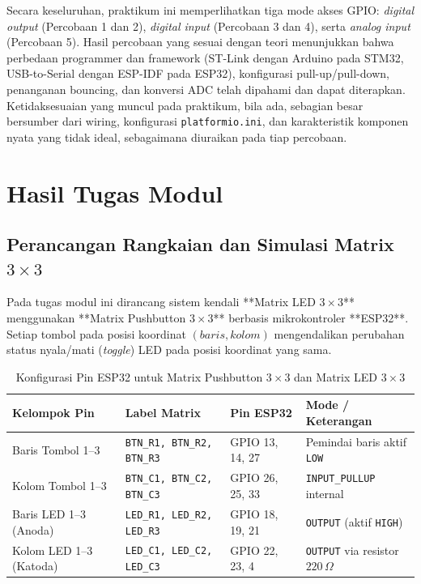 Secara keseluruhan, praktikum ini memperlihatkan tiga mode akses GPIO: \textit{digital output} (Percobaan 1 dan 2), \textit{digital input} (Percobaan 3 dan 4), serta \textit{analog input} (Percobaan 5). Hasil percobaan yang sesuai dengan teori menunjukkan bahwa perbedaan programmer dan framework (ST-Link dengan Arduino pada STM32, USB-to-Serial dengan ESP-IDF pada ESP32), konfigurasi pull-up/pull-down, penanganan bouncing, dan konversi ADC telah dipahami dan dapat diterapkan. Ketidaksesuaian yang muncul pada praktikum, bila ada, sebagian besar bersumber dari wiring, konfigurasi \texttt{platformio.ini}, dan karakteristik komponen nyata yang tidak ideal, sebagaimana diuraikan pada tiap percobaan.

\section{Hasil Tugas Modul}
\subsection{Perancangan Rangkaian dan Simulasi Matrix $3\times 3$}
Pada tugas modul ini dirancang sistem kendali **Matrix LED $3\times 3$** menggunakan **Matrix Pushbutton $3\times 3$** berbasis mikrokontroler **ESP32**. Setiap tombol pada posisi koordinat $(baris, kolom)$ mengendalikan perubahan status nyala/mati (\textit{toggle}) LED pada posisi koordinat yang sama.

\begin{table}[h!]
\centering
\caption{Konfigurasi Pin ESP32 untuk Matrix Pushbutton $3\times 3$ dan Matrix LED $3\times 3$}
\begin{tabular}{|l|l|l|l|}
\hline
\textbf{Kelompok Pin} & \textbf{Label Matrix} & \textbf{Pin ESP32} & \textbf{Mode / Keterangan} \\ \hline
Baris Tombol 1--3 & \texttt{BTN\_R1, BTN\_R2, BTN\_R3} & GPIO 13, 14, 27 & Pemindai baris aktif \texttt{LOW} \\ \hline
Kolom Tombol 1--3 & \texttt{BTN\_C1, BTN\_C2, BTN\_C3} & GPIO 26, 25, 33 & \texttt{INPUT\_PULLUP} internal \\ \hline
Baris LED 1--3 (Anoda) & \texttt{LED\_R1, LED\_R2, LED\_R3} & GPIO 18, 19, 21 & \texttt{OUTPUT} (aktif \texttt{HIGH}) \\ \hline
Kolom LED 1--3 (Katoda) & \texttt{LED\_C1, LED\_C2, LED\_C3} & GPIO 22, 23, 4 & \texttt{OUTPUT} via resistor $220\,\Omega$ \\ \hline
\end{tabular}
\end{table}

